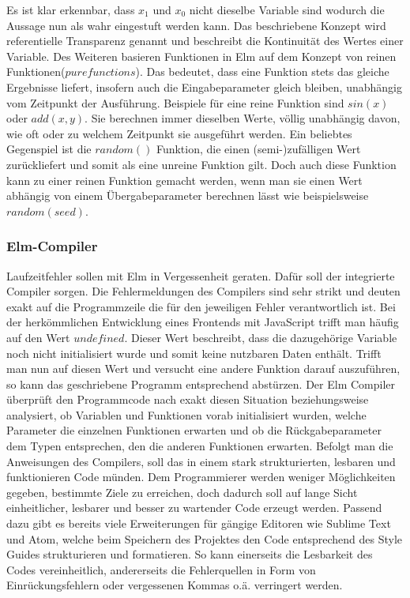 Es ist klar erkennbar, dass $x_1$ und $x_0$ nicht dieselbe Variable sind wodurch die Aussage nun als wahr eingestuft werden kann. Das beschriebene Konzept wird referentielle Transparenz genannt und beschreibt die Kontinuität des Wertes einer Variable.
Des Weiteren basieren Funktionen in Elm auf dem Konzept von reinen Funktionen($pure functions$). Das bedeutet, dass eine Funktion stets das gleiche Ergebnisse liefert, insofern auch die Eingabeparameter gleich bleiben, unabhängig vom Zeitpunkt der Ausführung. Beispiele für eine reine Funktion sind $sin(x)$ oder $add(x, y)$. Sie berechnen immer dieselben Werte, völlig unabhängig davon, wie oft oder zu welchem Zeitpunkt sie ausgeführt werden. Ein beliebtes Gegenspiel ist die $random()$ Funktion, die einen (semi-)zufälligen Wert zurückliefert und somit als eine unreine Funktion gilt. Doch auch diese Funktion kann zu einer reinen Funktion gemacht werden, wenn man sie einen Wert abhängig von einem Übergabeparameter berechnen lässt wie beispielsweise $random(seed)$.

\subsubsection{Elm-Compiler}
\label{sec:Elm-Compiler}
Laufzeitfehler sollen mit Elm in Vergessenheit geraten. Dafür soll der integrierte Compiler sorgen. Die Fehlermeldungen des Compilers sind sehr strikt und deuten exakt auf die Programmzeile die für den jeweiligen Fehler verantwortlich ist. Bei der herkömmlichen Entwicklung eines Frontends mit JavaScript trifft man häufig auf den Wert $undefined$. Dieser Wert beschreibt, dass die dazugehörige Variable noch nicht initialisiert wurde und somit keine nutzbaren Daten enthält. Trifft man nun auf diesen Wert und versucht eine andere Funktion darauf auszuführen, so kann das geschriebene Programm entsprechend abstürzen. Der Elm Compiler überprüft den Programmcode nach exakt diesen Situation beziehungsweise analysiert, ob Variablen und Funktionen vorab initialisiert wurden, welche Parameter die einzelnen Funktionen erwarten und ob die Rückgabeparameter dem Typen entsprechen, den die anderen Funktionen erwarten. Befolgt man die Anweisungen des Compilers, soll das in einem stark strukturierten, lesbaren und funktionieren Code münden.
Dem Programmierer werden weniger Möglichkeiten gegeben, bestimmte Ziele zu erreichen, doch dadurch soll auf lange Sicht einheitlicher, lesbarer und besser zu wartender Code erzeugt werden. Passend dazu gibt es bereits viele Erweiterungen für gängige Editoren wie Sublime Text und Atom, welche beim Speichern des Projektes den Code entsprechend des Style Guides strukturieren und formatieren. So kann einerseits die Lesbarkeit des Codes vereinheitlich, andererseits die Fehlerquellen in Form von Einrückungsfehlern oder vergessenen Kommas o.ä. verringert werden.

